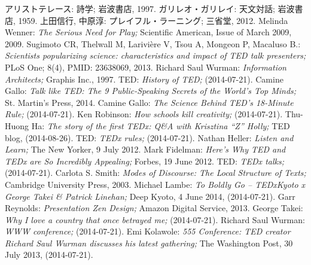 \documentclass[submit,techreq,jkeyword,noauthor]{ipsj}
\newcommand{\online}{}
\begin{document}
\begin{thebibliography}{10}
 アリストテレース: 詩学; 岩波書店, 1997.
 ガリレオ・ガリレイ: 天文対話; 岩波書店, 1959.
 上田信行, 中原淳: プレイフル・ラーニング; 三省堂, 2012.
 Melinda Wenner: \textsl{The Serious Need for Play;} Scientific American, Issue of March 2009, 2009.
 Sugimoto CR, Thelwall M, Larivière V, Tsou A, Mongeon P, Macaluso B.: \textsl{Scientists popularizing science: characteristics and impact of TED talk presenters;} PLoS One; 8(4), PMID: 23638069, 2013. 
 Richard Saul Wurman: \textsl{Information Architects;} Graphis Inc., 1997.
 TED: \textsl{History of TED\online;}  (2014-07-21).
 Camine Gallo: \textsl{Talk like TED: The 9 Public-Speaking Secrets of the World's Top Minds;} St. Martin's Press, 2014.
 Camine Gallo: \textsl{The Science Behind TED's 18-Minute Rule\online;}  (2014-07-21).
 Ken Robinson: \textsl{How schools kill creativity;}  (2014-07-21).
 Thu-Huong Ha: \textsl{The story of the first TEDx: Q\&A with Krisztina ``Z'' Holly\online;} TED blog,
 (2014-08-26).
 TED: \textsl{TEDx rules\online;}  (2014-07-21).
 Nathan Heller: \textsl{Listen and Learn;} The New Yorker, 9 July 2012.
 Mark Fidelman: \textsl{Here's Why TED and TEDx are So Incredibly Appealing;} Forbes, 19 June 2012.
 TED: \textsl{TEDx talks\online;}  (2014-07-21).
 Carlota S. Smith: \textsl{Modes of Discourse: The Local Structure of Texts;} Cambridge University Press, 2003.
 Michael Lambe: \textsl{To Boldly Go – TEDxKyoto x George Takei \& Patrick Linehan\online;} Deep Kyoto, 4 June 2014,  (2014-07-21).
 Garr Reynolds: \textsl{Presentation Zen Design;} Amazon Digital Service, 2013.
 George Takei: \textsl{Why I love a country that once betrayed me\online;}  (2014-07-21).
 Richard Saul Wurman: \textsl{WWW conference\online;}  (2014-07-21).
 Emi Kolawole: \textsl{555 Conference: TED creator Richard Saul Wurman discusses his latest gathering\online;} The Washington Post, 30 July 2013,  (2014-07-21).
\end{thebibliography}
\end{document}
